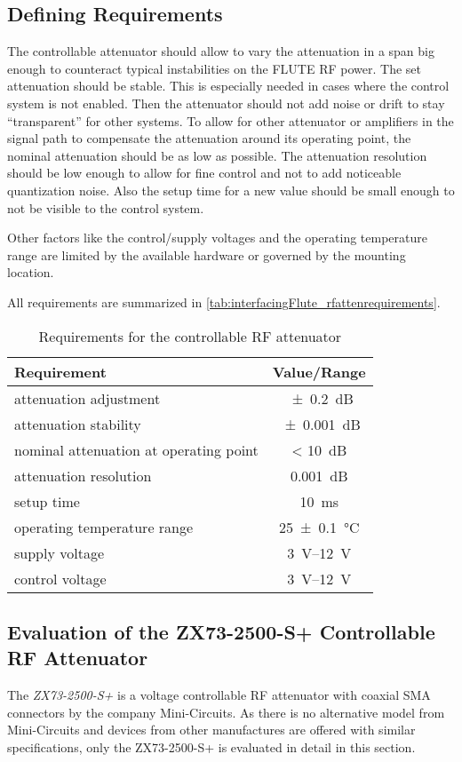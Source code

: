 \subsection{Defining Requirements}
The controllable attenuator should allow to vary the attenuation in a span big enough to counteract typical instabilities on the FLUTE RF power. The set attenuation should be stable. This is especially needed in cases where the control system is not enabled. Then the attenuator should not add noise or drift to stay ``transparent'' for other systems. To allow for other attenuator or amplifiers in the signal path to compensate the attenuation around its operating point, the nominal attenuation should be as low as possible. The attenuation resolution should be low enough to allow for fine control and not to add noticeable quantization noise. Also the setup time for a new value should be small enough to not be visible to the control system.

Other factors like the control/supply voltages and the operating temperature range are limited by the available hardware or governed by the mounting location.

All requirements are summarized in \autoref{tab:interfacingFlute_rfattenrequirements}.

\begin{table}[tbh]
\caption{Requirements for the controllable RF attenuator}
\label{tab:interfacingFlute_rfattenrequirements}
\centering
\begin{tabular}{lc}
\toprule
Requirement & {Value/Range}\\
\midrule
attenuation adjustment & \SI{\pm0.2}{\dB}\\
attenuation stability & \SI{\pm0.001}{\dB}\\
nominal attenuation at operating point & < \SI{10}{\dB}\\
attenuation resolution & \SI{0.001}{\dB}\\
setup time & \SI{10}{\milli\second}\\
operating temperature range & \SI{25\pm0.1}{\celsius}\\
supply voltage & \SIrange{3}{12}{\volt}\\
control voltage & \SIrange{3}{12}{\volt}\\
\bottomrule
\end{tabular}
\end{table}

\subsection{Evaluation of the ZX73-2500-S+ Controllable RF Attenuator}
The \textit{ZX73-2500-S+} is a voltage controllable RF attenuator with coaxial SMA connectors by the company Mini-Circuits. As there is no alternative model from Mini-Circuits and devices from other manufactures are offered with similar specifications, only the ZX73-2500-S+ is evaluated in detail in this section.



